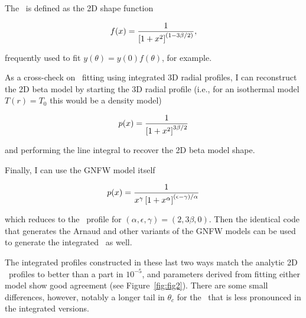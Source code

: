 The \betamodel\ is defined as the 2D shape function

\begin{equation}
f(x) = {1\over{\left[1 + x^2\right]^{(1-3\beta/2)}}},
\end{equation}

frequently used to fit $y(\theta) = y(0)f(\theta)$, for example.

As a cross-check on \climax\ fitting using integrated 3D radial
profiles, I can reconstruct the 2D beta model by starting the 3D
radial profile (i.e., for an isothermal model $T(r) = T_0$ this would
be a density model)

\begin{equation}
p(x) = {1\over{\left[1 + x^2\right]^{3\beta/2}}}
\end{equation}

and performing the line integral to recover the 2D beta model shape.

Finally, I can use the GNFW model itself

\begin{equation}
p(x) = {1\over{x^\gamma\left[1 + x^\alpha\right]^{(\epsilon-\gamma)/\alpha}}}
\end{equation}

which reduces to the \betamodel\ profile for $(\alpha,\epsilon,\gamma)
= (2, 3\beta, 0)$.  Then the identical code that generates the Arnaud
and other variants of the GNFW models can be used to generate the
integrated \betamodel\ as well.

The integrated profiles constructed in these last two ways match the
analytic 2D \betamodel\ profiles to better than a part in $10^{-5}$, and
parameters derived from fitting either model show good agreement (see
Figure~\ref{fig:fig2}).  There are some small differences, however,
notably a longer tail in $\theta_c$ for the \betamodel\ that is less
pronounced in the integrated versions.

